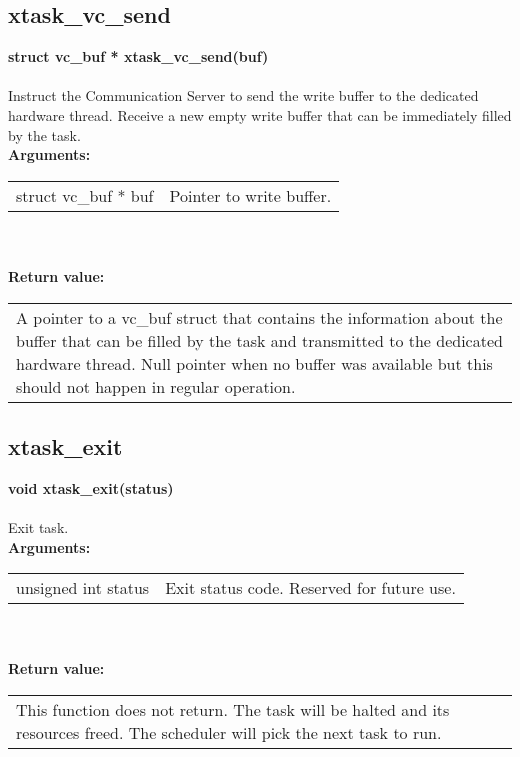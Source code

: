 \begin{samepage}
\subsection{xtask\_vc\_send}
\noindent
\textbf{struct vc\_buf * xtask\_vc\_send(buf)}\\\\
Instruct the Communication Server to send the write buffer
to the dedicated hardware thread. Receive a new empty
write buffer that can be immediately filled by the task.\\

\noindent
\textbf{Arguments:}\\
\indent\begin{tabular}{ p{4.5cm}  p{9cm} }
struct vc\_buf * buf      & Pointer to write buffer.\\            
\end{tabular}\\\\

\noindent
\textbf{Return value:}\\
\indent\begin{tabular}{  p{13.5cm} }
A pointer to a vc\_buf struct that contains the information
about the buffer that can be filled by the task and
transmitted to the dedicated hardware thread.
Null pointer when no buffer was available but this should
not happen in regular operation.
\end{tabular}
\end{samepage}

\begin{samepage}
\subsection{xtask\_exit}
\noindent
\textbf{void xtask\_exit(status)}\\\\
Exit task.\\

\noindent
\textbf{Arguments:}\\
\indent\begin{tabular}{ p{4.5cm}  p{9cm} }
unsigned int status      & Exit status code. Reserved for future use.\\            
\end{tabular}\\\\

\noindent
\textbf{Return value:}\\
\indent\begin{tabular}{  p{13.5cm} }
This function does not return. The task will be halted and its resources freed.
The scheduler will pick the next task to run.
\end{tabular}
\end{samepage}

